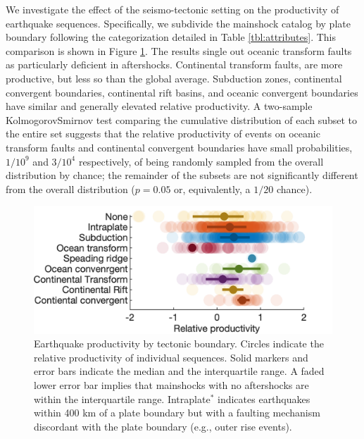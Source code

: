 \documentclass[draft, jgrga]{agujournal2018}
\begin{document}
    We investigate the effect of the seismo-tectonic setting on the productivity of earthquake sequences. Specifically, we subdivide the mainshock catalog by plate boundary following the categorization detailed in Table \ref{tbl:attributes}. This comparison is shown in Figure \ref{fig:plate_boundary}. The results single out oceanic transform faults as particularly deficient in aftershocks. Continental transform faults, are more productive, but less so than the global average. Subduction zones, continental convergent boundaries, continental rift basins, and oceanic convergent boundaries have similar and generally elevated relative productivity. A two-sample Kolmogorov\-Smirnov test comparing the cumulative distribution of each subset to the entire set suggests that the relative productivity of events on oceanic transform faults and continental convergent boundaries have small probabilities, $1/10^9$ and $3/10^4$ respectively, of being randomly sampled from the overall distribution by chance; the remainder of the subsets are not significantly different from the overall distribution ($p = 0.05$ or, equivalently, a  $1/20$ chance).

    \begin{figure}
        \centering
        \includegraphics{prod_by_pb.png}
        \caption{Earthquake productivity by tectonic boundary. Circles indicate the relative productivity of individual sequences. Solid markers and error bars indicate the median and the interquartile range. A faded lower error bar implies that mainshocks with no aftershocks are within the interquartile range. Intraplate$^*$ indicates earthquakes within 400 km of a plate boundary but with a faulting mechanism discordant with the plate boundary (e.g., outer rise events).}
        \label{fig:plate_boundary}
    \end{figure}
\end{document}
